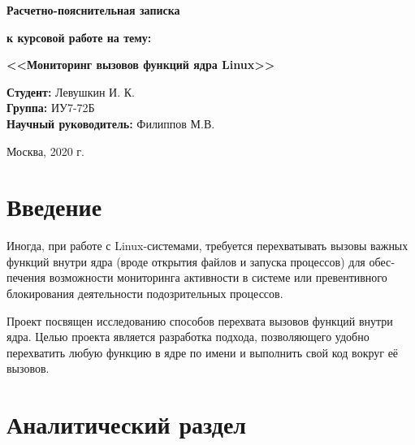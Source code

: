\documentclass[a4paper,14pt]{extarticle}
\begin{document}
 	\vspace*{30mm}
 	
 	\LARGE
 	\begin{center}
 		\textbf{Расчетно-пояснительная записка}
 		
 		\textbf{к курсовой работе на тему:}
 		
 		\textbf{<<Мониторинг вызовов функций ядра Linux>>}
 	\end{center}
 	
 	\vspace*{15mm}
 	
 	\large
 	\begin{flushleft}
 		\textbf{Студент:} Левушкин И. К. \\
 		\textbf{Группа:} ИУ7-72Б \\
 		\textbf{Научный руководитель:} Филиппов М.В.
 	\end{flushleft}
 	
 	\vspace*{50mm}
 	
 	\large
 	\begin{center}
 		Москва, 2020 г.
 	\end{center}
 	
 	\thispagestyle{empty}
 	
 	\newpage
 	
 	\tableofcontents
 	\newpage
 	\section*{Введение}
 	
 	Иногда, при работе с Linux-системами, требуется перехватывать вызовы важ­ных функций внутри ядра (вроде открытия файлов и запуска процессов) для обес­печения возможности мониторинга активности в системе или превентивного блоки­рования деятельности подозрительных процессов.
 	
 	Проект посвящен исследованию способов перехвата вызовов функций внут­ри ядра. Целью проекта является разработка подхода, позволяющего удобно перехватить любую функцию в ядре по имени и выполнить свой код вокруг её вызовов.
 	
 	\newpage
 	
 	\section{Аналитический раздел}
 	
\end{document}
